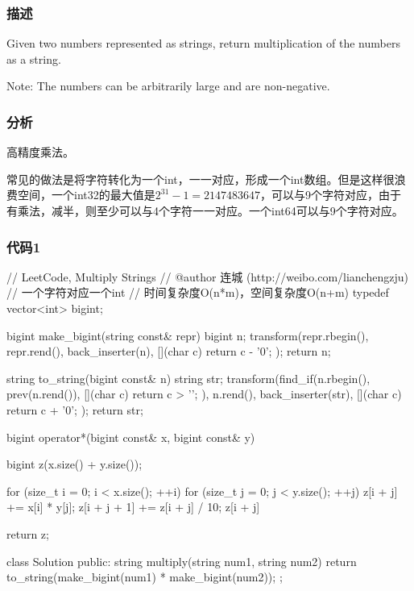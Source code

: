 \subsubsection{描述}
Given two numbers represented as strings, return multiplication of the numbers as a string.

Note: The numbers can be arbitrarily large and are non-negative.


\subsubsection{分析}
高精度乘法。

常见的做法是将字符转化为一个int，一一对应，形成一个int数组。但是这样很浪费空间，一个int32的最大值是$2^{31}-1=2147483647$，可以与9个字符对应，由于有乘法，减半，则至少可以与4个字符一一对应。一个int64可以与9个字符对应。


\subsubsection{代码1}
\begin{Code}
// LeetCode, Multiply Strings
// @author 连城 (http://weibo.com/lianchengzju)
// 一个字符对应一个int
// 时间复杂度O(n*m)，空间复杂度O(n+m)
typedef vector<int> bigint;

bigint make_bigint(string const& repr) {
    bigint n;
    transform(repr.rbegin(), repr.rend(), back_inserter(n),
            [](char c) { return c - '0'; });
    return n;
}

string to_string(bigint const& n) {
    string str;
    transform(find_if(n.rbegin(), prev(n.rend()),
            [](char c) { return c > '\0'; }), n.rend(), back_inserter(str),
            [](char c) { return c + '0'; });
    return str;
}

bigint operator*(bigint const& x, bigint const& y) {
    bigint z(x.size() + y.size());

    for (size_t i = 0; i < x.size(); ++i)
        for (size_t j = 0; j < y.size(); ++j) {
            z[i + j] += x[i] * y[j];
            z[i + j + 1] += z[i + j] / 10;
            z[i + j] %
        }

    return z;
}

class Solution {
public:
    string multiply(string num1, string num2) {
        return to_string(make_bigint(num1) * make_bigint(num2));
    }
};
\end{Code}


